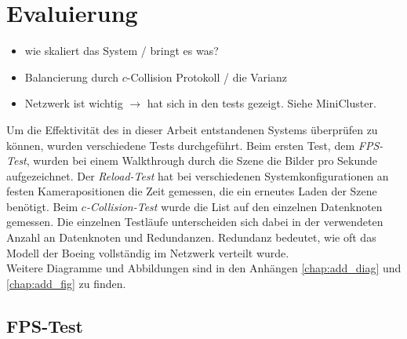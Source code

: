 \chapter{Evaluierung}
\label{chap:eval}
%
\begin{itemize}
 \item wie skaliert das System / bringt es was?
 \item Balancierung durch $c$-Collision Protokoll / die Varianz
 \item Netzwerk ist wichtig $\rightarrow$ hat sich in den tests gezeigt. Siehe MiniCluster.
\end{itemize}
%
%

Um die Effektivität des in dieser Arbeit entstandenen Systems überprüfen zu können, wurden verschiedene Tests durchgeführt.
Beim ersten Test, dem \textit{FPS-Test}, wurden bei einem Walkthrough durch die Szene die Bilder pro Sekunde aufgezeichnet. Der \textit{Reload-Test} hat bei verschiedenen Systemkonfigurationen an festen Kamerapositionen die Zeit gemessen, die ein erneutes Laden der Szene benötigt. Beim \textit{$c$-Collision-Test} wurde die List auf den einzelnen Datenknoten gemessen. Die einzelnen Testläufe unterscheiden sich dabei in der verwendeten Anzahl an Datenknoten und Redundanzen. Redundanz bedeutet, wie oft das Modell der Boeing vollständig im Netzwerk verteilt wurde. \\
Weitere Diagramme und Abbildungen sind in den Anhängen \ref{chap:add_diag} und \ref{chap:add_fig} zu finden.

\section{FPS-Test}
\label{sec:eval:fps}

